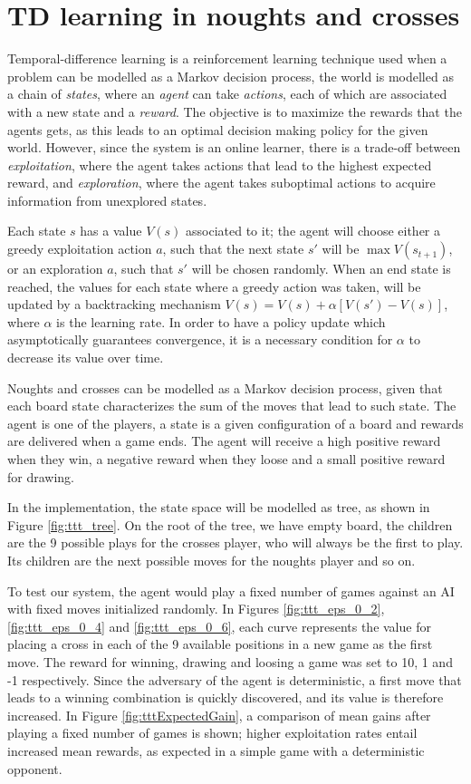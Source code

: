 \documentclass[12pt]{article}
\begin{document}
\section{TD learning in noughts and crosses}
\label{sec:td_ttt}

Temporal-difference learning\cite{Sutton1998} is a reinforcement learning technique used when a problem can be modelled as a Markov decision process, the world is modelled as a chain of \emph{states}, where an \emph{agent} can take \emph{actions}, each of which are associated with a new state and a \emph{reward}.
The objective is to maximize the rewards that the agents gets, as this leads to an optimal decision making policy for the given world.
However, since the system is an online learner, there is a trade-off between \emph{exploitation}, where the agent takes actions that lead to the highest expected reward, and \emph{exploration}, where the agent takes suboptimal actions to acquire information from unexplored states.

Each state $s$ has a value $V(s)$ associated to it; the agent will choose either a greedy exploitation action $a$, such that the next state $s'$  will be $\max V(s_{t + 1})$, or an exploration $a$, such that $s'$  will be chosen randomly.
When an end state is reached, the values for each state where a greedy action was taken, will be updated by a backtracking mechanism $V(s) = V(s) + \alpha \left[ V(s') - V(s) \right]$, where $\alpha$ is the learning rate.
In order to have a policy update which asymptotically guarantees convergence, it is a necessary condition for $\alpha$ to decrease its value over time.

Noughts and crosses can be modelled as a Markov decision process, given that each board state characterizes the sum of the moves that lead to such state.
The agent is one of the players, a state is a given configuration of a board and rewards are delivered when a game ends.
The agent will receive a high positive reward when they win, a negative reward when they loose and a small positive reward for drawing.

In the implementation, the state space will be modelled as tree, as shown in Figure \ref{fig:ttt_tree}.
On the root of the tree, we have empty board, the children are the 9 possible plays for the crosses player, who will always be the first to play.
Its children are the next possible moves for the noughts player and so on.

To test our system, the agent would play a fixed number of games against an AI with fixed moves initialized randomly.
In Figures \ref{fig:ttt_eps_0_2}, \ref{fig:ttt_eps_0_4} and \ref{fig:ttt_eps_0_6}, each curve represents the value for placing a cross in each of the 9 available positions in a new game as the first move.
The reward for winning, drawing and loosing a game was set to 10, 1 and -1 respectively.
Since the adversary of the agent is deterministic, a first move that leads to a winning combination is quickly discovered, and its value is therefore increased. 
In Figure \ref{fig:tttExpectedGain}, a comparison of mean gains after playing a fixed number of games is shown; higher exploitation rates entail increased mean rewards, as expected in a simple game with a deterministic opponent.
\end{document}

